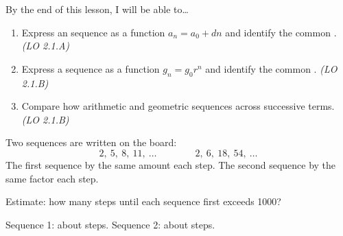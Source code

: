 \documentclass[10pt]{article}
\begin{document}
\namedateperiod

\vspace{0.06in}

\begin{objectivebox}
By the end of this lesson, I will be able to\ldots
\begin{enumerate}[itemsep=2pt]
  \item Express an \blank{3.5cm} sequence as a function $a_n = a_0 + dn$ and identify the
        common \blank{2.5cm}. \hfill\textit{(LO 2.1.A)}
  \item Express a \blank{3cm} sequence as a function $g_n = g_0 r^n$ and identify the
        common \blank{2cm}. \hfill\textit{(LO 2.1.B)}
  \item Compare how arithmetic and geometric sequences \blank{4cm} across successive terms. \hfill\textit{(LO 2.1.B)}
\end{enumerate}
\end{objectivebox}

\vspace{0.04in}

\begin{vocabbox}
\end{vocabbox}

\vspace{0.04in}

\begin{hookbox}
Two sequences are written on the board:
\[
  2,\ 5,\ 8,\ 11,\ \ldots \qquad\qquad 2,\ 6,\ 18,\ 54,\ \ldots
\]
The first sequence \blank{3cm} by the same amount each step.
The second sequence \blank{3cm} by the same factor each step.

\medskip
Estimate: how many steps until each sequence first exceeds 1000?

\medskip
Sequence 1: about \blank{2cm} steps. \quad Sequence 2: about \blank{2cm} steps.
\end{hookbox}

\vspace{0.04in}
\end{document}
